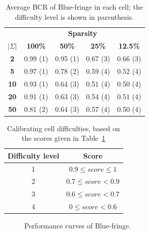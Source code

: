 \begin{table}
\begin{center}
\begin{tabular}{c|c c c c}
&\multicolumn{4}{|c}{\textbf{Sparsity}}\\ 
\textbf{$|\Sigma|$} & \textbf{100\%} & \textbf{50\%} & \textbf{25\%} & \textbf{12.5\%}\\
\hline
\textbf{2}  & 0.99 (1) & 0.95 (1) & 0.67 (3) & 0.66 (3)\\
\textbf{5}  & 0.97 (1) & 0.78 (2) & 0.59 (4) & 0.52 (4)\\
\textbf{10} & 0.93 (1) & 0.64 (3) & 0.51 (4) & 0.50 (4)\\
\textbf{20} & 0.91 (1) & 0.63 (3) & 0.54 (4) & 0.51 (4)\\
\textbf{50} & 0.81 (2) & 0.64 (3) & 0.57 (4) & 0.50 (4)\\
\end{tabular}
\end{center}
\caption{Average BCR of Blue-fringe in each cell; the difficulty level is shown in parenthesis.\label{table:stamina-baseline}}
\end{table}

\begin{table}
\begin{center}
\begin{tabular}{c|c}
Difficulty level & Score\\
\hline
1&$0.9 \leq score \leq 1$\\
2&$0.7 \leq score < 0.9$\\
3&$0.6 \leq score < 0.7$\\
4&$0 \leq score < 0.6$\\
\end{tabular}
\end{center}
\caption{\label{stamina:table:calibration}Calibrating cell difficulties, based on the scores given in Table~\ref{table:stamina-baseline}}
\end{table}

\begin{figure}
\centering{}
  \caption{Performance curves of Blue-fringe\label{stamina:image:bluefringe-performance}.}
\end{figure}

